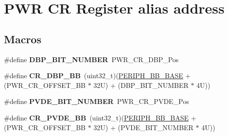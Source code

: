 \hypertarget{group___p_w_r___c_r__register__alias}{}\section{P\+WR CR Register alias address}
\label{group___p_w_r___c_r__register__alias}
\subsection*{Macros}
\begin{DoxyCompactItemize}
\item 
\mbox{\label{group___p_w_r___c_r__register__alias_ga398aef263adbda7c1f1dc9020fde83f3}} 
\#define {\bfseries D\+B\+P\+\_\+\+B\+I\+T\+\_\+\+N\+U\+M\+B\+ER}~P\+W\+R\+\_\+\+C\+R\+\_\+\+D\+B\+P\+\_\+\+Pos
\item 
\mbox{\label{group___p_w_r___c_r__register__alias_ga799ab60bdbcfc1076cf2d7f206d09b0c}} 
\#define {\bfseries C\+R\+\_\+\+D\+B\+P\+\_\+\+BB}~(uint32\+\_\+t)(\mbox{\hyperlink{group___peripheral__memory__map_gaed7efc100877000845c236ccdc9e144a}{P\+E\+R\+I\+P\+H\+\_\+\+B\+B\+\_\+\+B\+A\+SE}} + (P\+W\+R\+\_\+\+C\+R\+\_\+\+O\+F\+F\+S\+E\+T\+\_\+\+BB $\ast$ 32\+U) + (\+D\+B\+P\+\_\+\+B\+I\+T\+\_\+\+N\+U\+M\+B\+E\+R $\ast$ 4\+U))
\item 
\mbox{\label{group___p_w_r___c_r__register__alias_gae731170c1675c5471fc06501228905b0}} 
\#define {\bfseries P\+V\+D\+E\+\_\+\+B\+I\+T\+\_\+\+N\+U\+M\+B\+ER}~P\+W\+R\+\_\+\+C\+R\+\_\+\+P\+V\+D\+E\+\_\+\+Pos
\item 
\mbox{\label{group___p_w_r___c_r__register__alias_ga49f51ef8285a6be76fd204d49a00709c}} 
\#define {\bfseries C\+R\+\_\+\+P\+V\+D\+E\+\_\+\+BB}~(uint32\+\_\+t)(\mbox{\hyperlink{group___peripheral__memory__map_gaed7efc100877000845c236ccdc9e144a}{P\+E\+R\+I\+P\+H\+\_\+\+B\+B\+\_\+\+B\+A\+SE}} + (P\+W\+R\+\_\+\+C\+R\+\_\+\+O\+F\+F\+S\+E\+T\+\_\+\+BB $\ast$ 32\+U) + (\+P\+V\+D\+E\+\_\+\+B\+I\+T\+\_\+\+N\+U\+M\+B\+E\+R $\ast$ 4\+U))
\item 
\mbox{\label{group___p_w_r___c_r__register__alias_ga9fe65342711a2c4614ef2eadee4a751c}} 

\end{DoxyCompactItemize}
